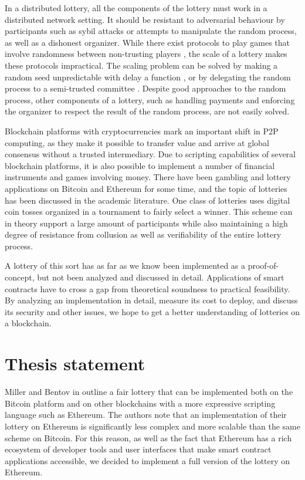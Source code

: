 In a distributed lottery, all the components of the lottery must work in a distributed network setting. It should be resistant to adversarial behaviour by participants such as sybil attacks or attempts to manipulate the random process, as well as a dishonest organizer. While there exist protocols to play games that involve randomness between non-trusting players \cite{shamir_mental_1981} \cite{blum1983coin} \cite{broder_provably_1985} \cite{goldreich_how_1987}, the scale of a lottery makes these protocols impractical. The scaling problem can be solved by making a random seed unpredictable with delay a function \cite{goldschlag_publicly_1998}, or by delegating the random process to a semi-trusted committee \cite{fouque_sharing_2001}. Despite good approaches to the random process, other components of a lottery, such as handling payments and enforcing the organizer to respect the result of the random process, are not easily solved. 

Blockchain platforms with cryptocurrencies mark an important shift in P2P computing, as they make it possible to transfer value and arrive at global consensus without a trusted intermediary. Due to scripting capabilities of several blockchain platforms, it is also possible to implement a number of financial instruments and games involving money. There have been gambling and lottery applications on Bitcoin and Ethereum for some time, and the topic of lotteries has been discussed in the academic literature. One class of lotteries uses digital coin tosses organized in a tournament to fairly select a winner. This scheme can in theory support a large amount of participants while also maintaining a high degree of resistance from collusion as well as verifiability of the entire lottery process.

A lottery of this sort has as far as we know been implemented as a proof-of-concept, but not been analyzed and discussed in detail. Applications of smart contracts have to cross a gap from theoretical soundness to practical feasibility. By analyzing an implementation in detail, measure its cost to deploy, and discuss its security and other issues, we hope to get a better understanding of lotteries on a blockchain.

\section{Thesis statement}
\label{sec:statement}

Miller and Bentov in \cite{miller_zero-collateral_2017} outline a fair lottery that can be implemented both on the Bitcoin platform and on other blockchains with a more expressive scripting language such as Ethereum. The authors note that an implementation of their lottery on Ethereum is significantly less complex and more scalable than the same scheme on Bitcoin. For this reason, as well as the fact that Ethereum has a rich ecosystem of developer tools and user interfaces that make smart contract applications accessible, we decided to implement a full version of the lottery on Ethereum. 


